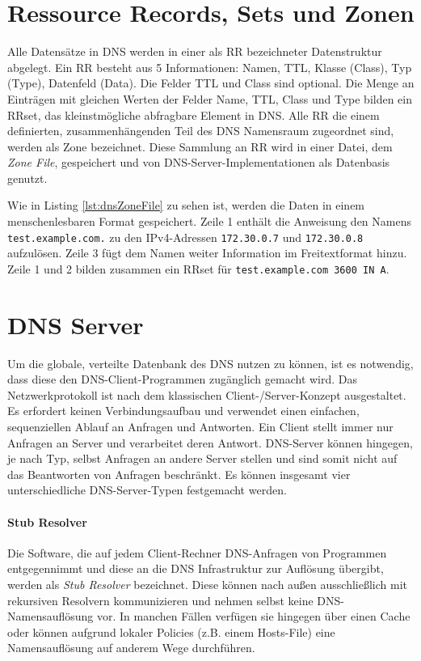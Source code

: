 \section{Ressource Records, Sets und Zonen}
Alle Datensätze in DNS werden in einer als \ac{RR} bezeichneter Datenstruktur abgelegt. Ein \ac{RR} besteht aus 5 Informationen: Namen, \ac{TTL}, Klasse (Class), Typ (Type), Datenfeld (Data). Die Felder \ac{TTL} und Class sind optional. Die Menge an Einträgen mit gleichen Werten der Felder Name, TTL, Class und Type bilden ein \ac{RRset}\cite{rfc2181}, das kleinstmögliche abfragbare Element in DNS. Alle \ac{RR} die einem definierten, zusammenhängenden Teil des DNS Namensraum zugeordnet sind, werden als Zone bezeichnet. Diese Sammlung an RR wird in einer Datei, dem \textit{Zone File}, gespeichert und von DNS-Server-Implementationen als Datenbasis genutzt.   

Wie in Listing \ref{lst:dnsZoneFile} zu sehen ist, werden die Daten in einem menschenlesbaren Format gespeichert. Zeile 1 enthält die Anweisung den Namens \texttt{test.example.com.} zu den IPv4-Adressen \texttt{172.30.0.7} und \texttt{172.30.0.8} aufzulösen. Zeile 3 fügt dem Namen weiter Information im Freitextformat hinzu. Zeile 1 und 2 bilden zusammen ein RRset für \texttt{test.example.com 3600 IN A}.



\section{DNS Server}
\label{sec:dnsserver}
Um die globale, verteilte Datenbank des DNS nutzen zu können, ist es notwendig, dass diese den DNS-Client-Programmen zugänglich gemacht wird. Das Netzwerkprotokoll ist nach dem klassischen Client-/Server-Konzept ausgestaltet. Es erfordert keinen Verbindungsaufbau und verwendet einen einfachen, sequenziellen Ablauf an Anfragen und Antworten. Ein Client stellt immer nur Anfragen an Server und verarbeitet deren Antwort. DNS-Server können hingegen, je nach Typ, selbst Anfragen an andere Server stellen und sind somit nicht auf das Beantworten von Anfragen beschränkt. Es können insgesamt vier unterschiedliche DNS-Server-Typen festgemacht werden.

\paragraph{Stub Resolver}
Die Software, die auf jedem Client-Rechner DNS-Anfragen von Programmen entgegennimmt und diese an die DNS Infrastruktur zur Auflösung übergibt, werden als \textit{Stub Resolver} bezeichnet. Diese können nach außen ausschließlich mit rekursiven Resolvern kommunizieren und nehmen selbst keine DNS-Namensauflösung vor. In manchen Fällen verfügen sie hingegen über einen Cache oder können aufgrund lokaler Policies (z.B. einem Hosts-File) eine Namensauflösung auf anderem Wege durchführen.

